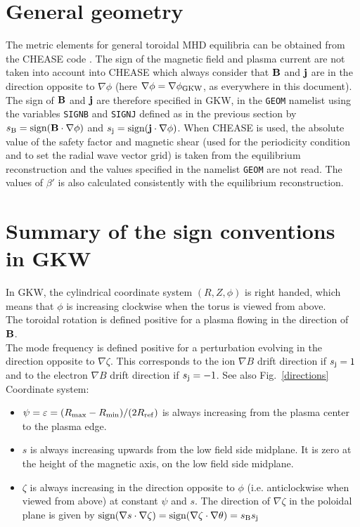 \documentclass{report}
\begin{document}
\section{General geometry}
The metric elements for general toroidal MHD equilibria can be obtained from the CHEASE code \cite{LUT96}. The sign of the magnetic field and plasma current are not taken into account into CHEASE
which always consider that ${\bf B}$ and ${\bf j}$ are in the direction opposite to $\nabla \phi$ (here
$\nabla \phi = \nabla \phi_{\rm GKW}$, as everywhere in this document). The sign of ${\bf B}$ and ${\bf j}$ are therefore specified in GKW, in the \texttt{GEOM} namelist
using the variables \texttt{SIGNB} and \texttt{SIGNJ} defined as in the previous section by $s_{\rm B}=\textrm{sign}(\bf{B}\cdot\nabla\phi)$ and $s_{\rm j}=\textrm{sign}(\bf{j}\cdot\nabla\phi)$. When
CHEASE is used, the absolute value of the safety factor and magnetic shear (used for the periodicity condition and to set the radial wave vector grid) is taken from the equilibrium reconstruction and
the values specified in the namelist \texttt{GEOM} are not read. The values of $\beta'$ is also calculated consistently with the equilibrium reconstruction.



\section{Summary of the sign conventions in GKW} 
\label{signs}
In GKW, the cylindrical coordinate system $(R,Z,\phi)$ is right handed, which means that $\phi$ is increasing clockwise when the torus is viewed from above.\\
The toroidal rotation is defined positive for a plasma flowing in the direction of ${\bf B}$.\\
The mode frequency is defined positive for a perturbation evolving in the direction opposite to $\nabla \zeta$. This corresponds to the ion $\nabla B$ drift direction if $s_{\rm j}=1$ and to the
electron $\nabla B$ drift direction if $s_{\rm j}=-1$.  See also Fig.~\ref{directions}\\
Coordinate system:
\begin{itemize}
 \item $\psi=\varepsilon=(R_{\rm max}-R_{\rm min})/(2R_{\rm ref})$ is always increasing from the plasma center to the plasma edge.
 \item $s$ is always increasing upwards from the low field side midplane. It is zero at the height of the magnetic axis, on the low field side midplane.
 \item $\zeta$ is always increasing in the direction opposite to $\phi$ (i.e. anticlockwise when viewed from above) at constant $\psi$ and $s$. The direction of $\nabla \zeta$ in the poloidal plane is
given by $\textrm{sign}(\nabla s \cdot \nabla \zeta)=\textrm{sign}(\nabla 
\zeta \cdot \nabla \theta)=s_{\rm B}s_{\rm j}$
\end{itemize}
\end{document}
